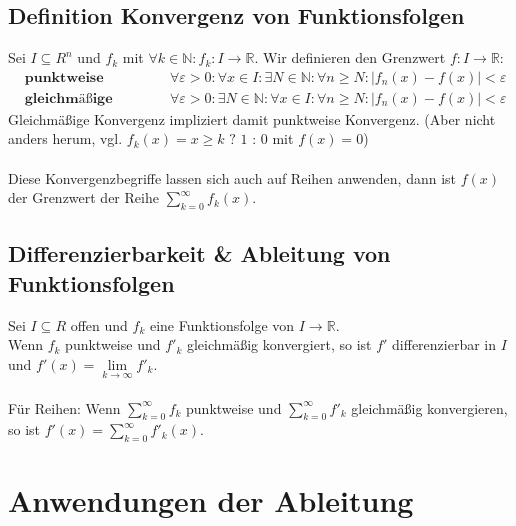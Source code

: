 \documentclass[halfparscip]{scrartcl}
\newcounter{subsection2}
\begin{document}
\subsection{Definition Konvergenz von Funktionsfolgen}
Sei $I \subseteq R^n$ und $f_k$ mit $\forall k \in \mathbb{N}: f_k: I \rightarrow \mathbb{R}$. Wir definieren den Grenzwert $f : I \rightarrow \mathbb{R}$:
\begin{align*}
	&\textbf{punktweise Konvergenz:} & &\forall \varepsilon > 0: \forall x \in I: \exists N \in \mathbb{N} : \forall n \geq N: \vert f_n(x)-f(x)\vert < \varepsilon\\
	&\textbf{gleichmäßige Konvergenz:} & &\forall \varepsilon > 0: \exists N \in \mathbb{N} : \forall x \in I: \forall n \geq N: \vert f_n(x)-f(x)\vert < \varepsilon
\end{align*}
Gleichmäßige Konvergenz impliziert damit punktweise Konvergenz. (Aber nicht anders herum, vgl. $f_k(x) = x \geq k \texttt{ ? } 1 \texttt{ : } 0$ mit $f(x) = 0$) \\\\
Diese Konvergenzbegriffe lassen sich auch auf Reihen anwenden, dann ist $f(x)$ der Grenzwert der Reihe $\sum\limits_{k=0}^\infty f_k(x)$.

\subsection{Differenzierbarkeit \& Ableitung von Funktionsfolgen}
Sei $I \subseteq R$ offen und $f_k$ eine Funktionsfolge von $I \rightarrow \mathbb{R}$. \\
Wenn $f_k$ punktweise und $f'_k$ gleichmäßig konvergiert, so ist $f'$ differenzierbar in $I$ und $f'(x) = \lim\limits_{k\rightarrow \infty}f'_k$.\\\\
Für Reihen: Wenn $\sum\limits_{k=0}^\infty f_k$ punktweise und $\sum\limits_{k=0}^\infty f'_k$ gleichmäßig konvergieren, so ist $f'(x) = \sum\limits_{k=0}^\infty f'_k(x)$.

\newpage
\section{Anwendungen der Ableitung}
\end{document}
